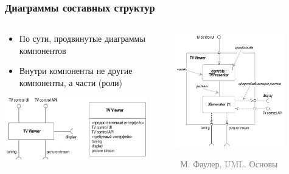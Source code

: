 \documentclass[xetex,mathserif,serif]{beamer}
\newcommand{\attribution}[1] {
    \vspace{-5mm}\begin{flushright}\begin{scriptsize}\textcolor{gray}{\textcopyright\, #1}\end{scriptsize}\end{flushright}
}
\begin{document}
    \begin{frame}
        \frametitle{Диаграммы составных структур}
        \begin{columns}
            \begin{column}{0.5\textwidth}
                \begin{itemize}
                    \item По сути, продвинутые диаграммы компонентов
                    \item Внутри компоненты не другие компоненты, а части (роли)
                \end{itemize}
                \vspace{3mm}
                \begin{center}
                    \includegraphics[width=0.9\textwidth]{compositeStructureElement.png}
                \end{center}
            \end{column}
            \begin{column}{0.5\textwidth}
                \begin{center}
                    \includegraphics[width=0.8\textwidth]{compositeStructureDiagram.png}
                    \attribution{М. Фаулер, UML. Основы}
                \end{center}
            \end{column}
        \end{columns}
    \end{frame}
\end{document}
